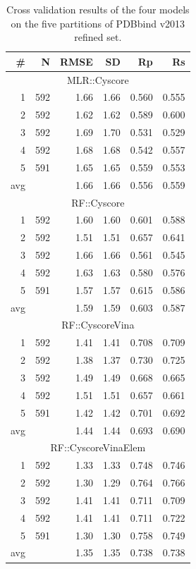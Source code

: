 \begin{table}
\caption{Cross validation results of the four models on the five partitions of PDBbind v2013 refined set.}
\label{rfcyscore:cv-stat}
\begin{tabular}{rrrrrr}
\hline
\# & N & RMSE & SD & Rp & Rs\\
\hline
\multicolumn{6}{c}{MLR::Cyscore}\\
  1 & 592 & 1.66 & 1.66 & 0.560 & 0.555\\
  2 & 592 & 1.62 & 1.62 & 0.589 & 0.600\\
  3 & 592 & 1.69 & 1.70 & 0.531 & 0.529\\
  4 & 592 & 1.68 & 1.68 & 0.542 & 0.557\\
  5 & 591 & 1.65 & 1.65 & 0.559 & 0.553\\
avg &     & 1.66 & 1.66 & 0.556 & 0.559\\
\hline
\multicolumn{6}{c}{RF::Cyscore}\\
  1 & 592 & 1.60 & 1.60 & 0.601 & 0.588\\
  2 & 592 & 1.51 & 1.51 & 0.657 & 0.641\\
  3 & 592 & 1.66 & 1.66 & 0.561 & 0.545\\
  4 & 592 & 1.63 & 1.63 & 0.580 & 0.576\\
  5 & 591 & 1.57 & 1.57 & 0.615 & 0.586\\
avg &     & 1.59 & 1.59 & 0.603 & 0.587\\
\hline
\multicolumn{6}{c}{RF::CyscoreVina}\\
  1 & 592 & 1.41 & 1.41 & 0.708 & 0.709\\
  2 & 592 & 1.38 & 1.37 & 0.730 & 0.725\\
  3 & 592 & 1.49 & 1.49 & 0.668 & 0.665\\
  4 & 592 & 1.51 & 1.51 & 0.657 & 0.661\\
  5 & 591 & 1.42 & 1.42 & 0.701 & 0.692\\
avg &     & 1.44 & 1.44 & 0.693 & 0.690\\
\hline
\multicolumn{6}{c}{RF::CyscoreVinaElem}\\
  1 & 592 & 1.33 & 1.33 & 0.748 & 0.746\\
  2 & 592 & 1.30 & 1.29 & 0.764 & 0.766\\
  3 & 592 & 1.41 & 1.41 & 0.711 & 0.709\\
  4 & 592 & 1.41 & 1.41 & 0.711 & 0.722\\
  5 & 591 & 1.30 & 1.30 & 0.758 & 0.749\\
avg &     & 1.35 & 1.35 & 0.738 & 0.738\\
\hline
\end{tabular}
\end{table}

